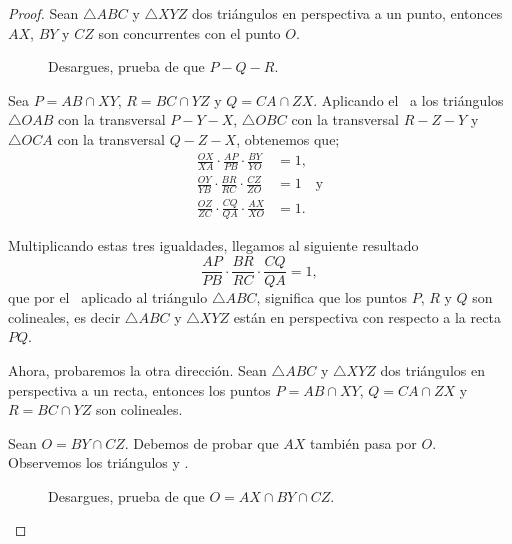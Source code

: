 \begin{proof}
    Sean $\triangle ABC$ y $\triangle XYZ$ dos triángulos en perspectiva a un punto, entonces $AX$, $BY$ y $CZ$ son concurrentes con el punto $O$.
    \begin{multicols}{2}
        \begin{figure}[H]
            \centering
            
            \caption{Desargues, prueba de que $P - Q - R$.}
        \end{figure}
        Sea $P = AB \cap XY$, $R = BC \cap YZ$ y $Q = CA \cap ZX$.
        Aplicando el~ a los triángulos $\triangle OAB$ con la transversal $P - Y - X$, $\triangle OBC$ con la transversal $R - Z - Y$ y $\triangle OCA$ con la transversal $Q - Z - X$, obtenemos que;
        \begin{align*}
            \frac{OX}{XA} \cdot \frac{AP}{PB} \cdot \frac{BY}{YO} &= 1,\\[1mm]
            \frac{OY}{YB} \cdot \frac{BR}{RC} \cdot \frac{CZ}{ZO} &= 1\quad \text{y}\\[1mm]
            \frac{OZ}{ZC} \cdot \frac{CQ}{QA} \cdot \frac{AX}{XO} &= 1.
        \end{align*}
    \end{multicols}

    Multiplicando estas tres igualdades, llegamos al siguiente resultado
    \[
        \frac{AP}{PB} \cdot \frac{BR}{RC} \cdot \frac{CQ}{QA} = 1,
    \]
    que por el~ aplicado al triángulo $\triangle ABC$, significa que los puntos $P$, $R$ y $Q$ son colineales, es decir $\triangle ABC$ y $\triangle XYZ$ están en perspectiva con respecto a la recta $PQ$.

    Ahora, probaremos la otra dirección.
    Sean $\triangle ABC$ y $\triangle XYZ$ dos triángulos en perspectiva a un recta, entonces los puntos $P = AB \cap XY$, $Q = CA \cap ZX$ y $R = BC \cap YZ$ son colineales.

    Sean $O = BY \cap CZ$.
    Debemos de probar que $AX$ también pasa por $O$.
    Observemos los triángulos  y .

    \begin{multicols}{2}
        \begin{figure}[H]
            \centering
            
            \caption{Desargues, prueba de que $O = AX \cap BY \cap CZ$.}
        \end{figure}


\end{multicols}
\end{proof}
